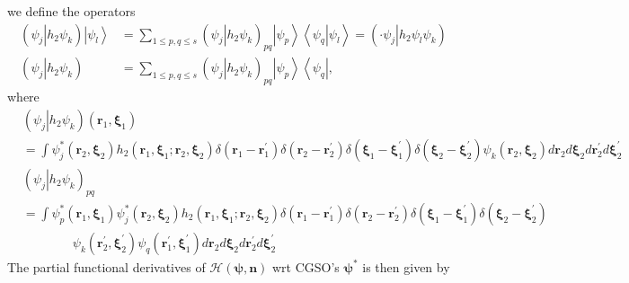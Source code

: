 \documentclass[aps,preprint]{revtex4}%
\begin{document}
we define the operators
\begin{align}
\left(  \left.  \psi_{j}\right\vert h_{2}\psi_{k}\right)  \left\vert \psi
_{l}\right\rangle  &  =\sum_{1\leq p,q\leq s}\left(  \left.  \psi
_{j}\right\vert h_{2}\psi_{k}\right)  _{pq}\left\vert \psi_{p}\right\rangle
\left\langle \left.  \psi_{q}\right\vert \psi_{l}\right\rangle =\left(
\left.  \cdot\psi_{j}\right\vert h_{2}\psi_{l}\psi_{k}\right) \\
\left(  \left.  \psi_{j}\right\vert h_{2}\psi_{k}\right)   &  =\sum_{1\leq
p,q\leq s}\left(  \left.  \psi_{j}\right\vert h_{2}\psi_{k}\right)
_{pq}\left\vert \psi_{p}\right\rangle \left\langle \psi_{q}\right\vert ,
\end{align}
where
\begin{align}
&  \left(  \left.  \psi_{j}\right\vert h_{2}\psi_{k}\right)  \left(
\mathbf{r}_{1},\mathbf{\xi}_{1}\right) \nonumber\\
&  =\int\psi_{j}^{\ast}\left(  \mathbf{r}_{2}\mathbf{,\xi}_{2}\right)
h_{2}\left(  \mathbf{r}_{1}\mathbf{,\xi}_{1};\mathbf{r}_{2}\mathbf{,\xi}%
_{2}\right)  \delta\left(  \mathbf{r}_{1}-\mathbf{r}_{1}^{\prime}\right)
\delta\left(  \mathbf{r}_{2}-\mathbf{r}_{2}^{\prime}\right)  \delta\left(
\mathbf{\xi}_{1}-\mathbf{\xi}_{1}^{\prime}\right)  \delta\left(  \mathbf{\xi
}_{2}-\mathbf{\xi}_{2}^{\prime}\right)  \psi_{k}\left(  \mathbf{r}%
_{2}\mathbf{,\xi}_{2}\right)  d\mathbf{r}_{2}d\mathbf{\xi}_{2}d\mathbf{r}%
_{2}^{\prime}d\mathbf{\xi}_{2}^{\prime}\nonumber\\
&  \left(  \left.  \psi_{j}\right\vert h_{2}\psi_{k}\right)  _{pq}\nonumber\\
&  =\int\psi_{p}^{\ast}\left(  \mathbf{r}_{1}\mathbf{,\xi}_{1}\right)
\psi_{j}^{\ast}\left(  \mathbf{r}_{2}\mathbf{,\xi}_{2}\right)  h_{2}\left(
\mathbf{r}_{1}\mathbf{,\xi}_{1};\mathbf{r}_{2}\mathbf{,\xi}_{2}\right)
\delta\left(  \mathbf{r}_{1}-\mathbf{r}_{1}^{\prime}\right)  \delta\left(
\mathbf{r}_{2}-\mathbf{r}_{2}^{\prime}\right)  \delta\left(  \mathbf{\xi}%
_{1}-\mathbf{\xi}_{1}^{\prime}\right)  \delta\left(  \mathbf{\xi}%
_{2}-\mathbf{\xi}_{2}^{\prime}\right) \nonumber\\
&  \qquad\qquad\psi_{k}\left(  \mathbf{r}_{2}^{\prime}\mathbf{,\xi}%
_{2}^{\prime}\right)  \psi_{q}\left(  \mathbf{r}_{1}^{\prime}\mathbf{,\xi}%
_{1}^{\prime}\right)  d\mathbf{r}_{2}d\mathbf{\xi}_{2}d\mathbf{r}_{2}^{\prime
}d\mathbf{\xi}_{2}^{\prime}%
\end{align}
The partial functional derivatives of $\mathcal{H}\left(  \mathbf{\psi
,n}\right)  $ wrt CGSO's $\mathbf{\psi}^{\ast}$ is then given by%
\end{document}
